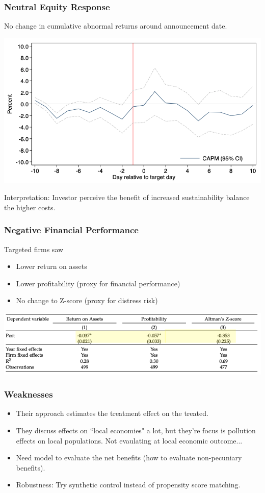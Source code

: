 \documentclass{beamer}
\begin{document}
\begin{frame}
\frametitle{Neutral Equity Response}

No change in cumulative abnormal returns around announcement date.

\bigskip
\includegraphics[scale=0.3]{equity_response}
\bigskip

Interpretation: Investor perceive the benefit of increased sustainability balance the higher costs.
\end{frame}



\begin{frame}
\frametitle{Negative Financial Performance}
Targeted firms saw
\begin{itemize}[<+->]
\item Lower return on assets
\item Lower profitability (proxy for financial performance)
\item No change to Z-score (proxy for distress risk)
\end{itemize}
\bigskip
\includegraphics[scale=0.4]{financial_performance}

\end{frame}



\begin{frame}
\frametitle{Weaknesses}

\begin{itemize}[<+->]
\item Their approach estimates the treatment effect on the treated.
\bigskip
\item They discuss effects on ``local economies" a lot, but they're focus is pollution effects on local populations. Not evaulating at local economic outcome...
\bigskip
\item Need model to evaluate the net benefits (how to evaluate non-pecuniary benefits).
\bigskip
\item Robustness: Try synthetic control instead of propensity score matching.
\end{itemize}

\end{frame}
\end{document}
